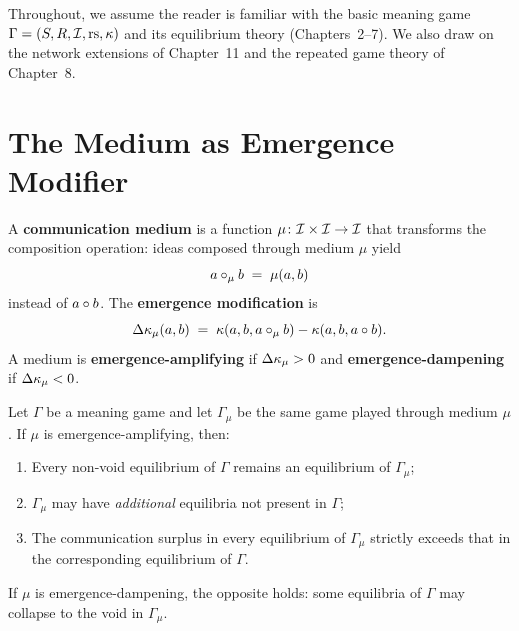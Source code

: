 Throughout, we assume the reader is familiar with the basic meaning
game $\Gamma = (S, R, \mathcal{I}, \mathrm{rs}, \kappa)$ and its equilibrium
theory (Chapters~2--7).  We also draw on the network extensions
of Chapter~11 and the repeated game theory of Chapter~8.

\section{The Medium as Emergence Modifier}
\label{sec:medium-message}

\begin{definition}
\label{def:medium}
A \textbf{communication medium} is a function $\mu \colon \mathcal{I}
\times \mathcal{I} \to \mathcal{I}$ that transforms the composition operation:
ideas composed through medium $\mu$ yield
\[
  a \circ_\mu b \;=\; \mu(a, b)
\]
instead of $a \circ b$.  The \textbf{emergence modification} is
\[
  \Delta\kappa_\mu(a,b) \;=\;
  \kappa(a, b, a \circ_\mu b) - \kappa(a, b, a \circ b).
\]
A medium is \textbf{emergence-amplifying} if $\Delta\kappa_\mu > 0$
and \textbf{emergence-dampening} if $\Delta\kappa_\mu < 0$.
\end{definition}

\begin{theorem}
\label{thm:mcluhan}
Let $\Gamma$ be a meaning game and let $\Gamma_\mu$ be the same
game played through medium $\mu$.  If $\mu$ is emergence-amplifying,
then:
\begin{enumerate}[label=(\roman*)]
  \item Every non-void equilibrium of $\Gamma$ remains an
    equilibrium of $\Gamma_\mu$;
  \item $\Gamma_\mu$ may have \emph{additional} equilibria not
    present in $\Gamma$;
  \item The communication surplus in every equilibrium of
    $\Gamma_\mu$ strictly exceeds that in the corresponding
    equilibrium of $\Gamma$.
\end{enumerate}
If $\mu$ is emergence-dampening, the opposite holds: some equilibria
of $\Gamma$ may collapse to the void in $\Gamma_\mu$.
\end{theorem}

